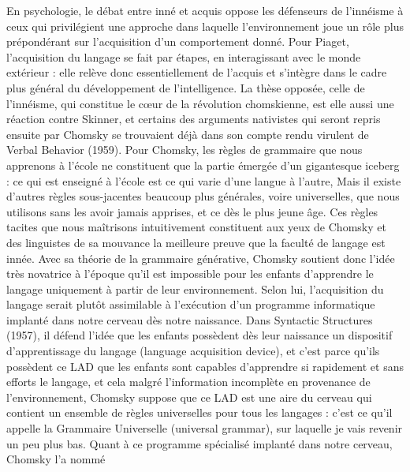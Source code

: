En psychologie, le débat entre inné et acquis oppose les défenseurs de l'innéisme à ceux qui
privilégient une approche dans laquelle l’environnement joue un rôle plus prépondérant sur
l'acquisition d’un comportement donné. Pour Piaget, l'acquisition du langage se fait par étapes,
en interagissant avec le monde extérieur : elle relève donc essentiellement de l'acquis et s'intègre
dans le cadre plus général du développement de l'intelligence.
La thèse opposée, celle de l’innéisme, qui constitue le cœur de la révolution chomskienne, est elle
aussi une réaction contre Skinner, et certains des arguments nativistes qui seront repris ensuite
par Chomsky se trouvaient déjà dans son compte rendu virulent de Verbal Behavior (1959). Pour
Chomsky, les règles de grammaire que nous apprenons à l'école ne constituent que la partie
émergée d’un gigantesque iceberg : ce qui est enseigné à l’école est ce qui varie d’une langue à
l'autre, Mais il existe d’autres règles sous-jacentes beaucoup plus générales, voire universelles,
que nous utilisons sans les avoir jamais apprises, et ce dès le plus jeune âge. Ces règles tacites que
nous maîtrisons intuitivement constituent aux yeux de Chomsky et des linguistes de sa mouvance
la meilleure preuve que la faculté de langage est innée.
Avec sa théorie de la grammaire générative, Chomsky soutient donc l'idée très novatrice à
l'époque qu'il est impossible pour les enfants d'apprendre le langage uniquement à partir de
leur environnement. Selon lui, l'acquisition du langage serait plutôt assimilable à l'exécution
d'un programme informatique implanté dans notre cerveau dès notre naissance. Dans Syntactic
Structures (1957), il défend l’idée que les enfants possèdent dès leur naissance un dispositif
d'apprentissage du langage (language acquisition device), et c'est parce qu'ils possèdent ce LAD
que les enfants sont capables d'apprendre si rapidement et sans efforts le langage, et cela malgré
l'information incomplète en provenance de l'environnement, Chomsky suppose que ce LAD est
une aire du cerveau qui contient un ensemble de règles universelles pour tous les langages : c'est
ce qu'il appelle la Grammaire Universelle (universal grammar), sur laquelle je vais revenir un
peu plus bas. Quant à ce programme spécialisé implanté dans notre cerveau, Chomsky l’a nommé
